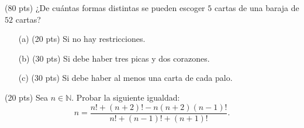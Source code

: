 \documentclass[a4paper,12pt,twoside,spanish]{amsbook}
\begin{document}

    \begin{ejercicio}[1]
        (80 pts)  ¿De cuántas formas distintas se pueden escoger $5$  cartas de una baraja de $52$ cartas?
            \begin{enumerate}
                \item[(a)] (20 pts) Si no hay restricciones.
                \item[(b)] (30 pts) Si debe haber tres picas y dos corazones.
                \item[(c)] (30 pts) Si debe haber al menos una carta de cada palo.
            \end{enumerate}
    \end{ejercicio}


    \begin{ejercicio}[2] (20 pts) Sea $n\in\mathbb{N}$.  Probar la siguiente igualdad:
        $$
        n = \frac{n! + (n+2)! - n(n+2)(n-1)!}{n!+(n-1)!+(n+1)!}.
        $$
    \end{ejercicio}
\end{document}
